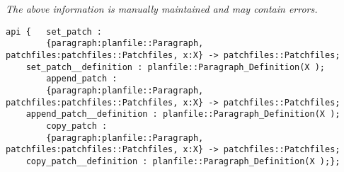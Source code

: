 \label{api:Planfile\_Junk}

{\tiny \it The above information is manually maintained and may contain errors.}
\begin{verbatim}
api {   set_patch :
        {paragraph:planfile::Paragraph, patchfiles:patchfiles::Patchfiles, x:X} -> patchfiles::Patchfiles;
    set_patch__definition : planfile::Paragraph_Definition(X );
        append_patch :
        {paragraph:planfile::Paragraph, patchfiles:patchfiles::Patchfiles, x:X} -> patchfiles::Patchfiles;
    append_patch__definition : planfile::Paragraph_Definition(X );
        copy_patch :
        {paragraph:planfile::Paragraph, patchfiles:patchfiles::Patchfiles, x:X} -> patchfiles::Patchfiles;
    copy_patch__definition : planfile::Paragraph_Definition(X );};
\end{verbatim}
